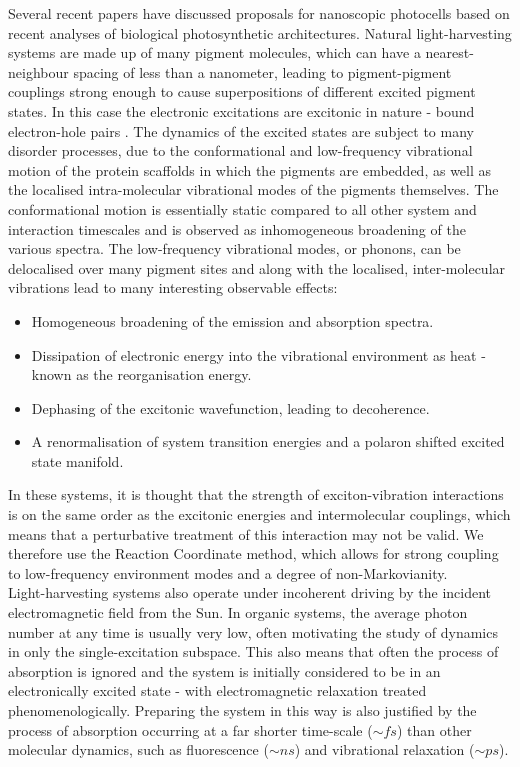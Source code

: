 \documentclass[]{article}
\begin{document}
Several recent papers have discussed proposals for nanoscopic photocells based on recent analyses of biological photosynthetic architectures\cite{Dorfman}\cite{Creatore2013}\cite{Killoran2015}\cite{Fruchtman2016}. Natural light-harvesting systems are made up of many pigment molecules, which can have a nearest-neighbour spacing of less than a nanometer\cite{Adolphs2006}, leading to pigment-pigment couplings strong enough to cause superpositions of different excited pigment states. In this case the electronic excitations are excitonic in nature - bound electron-hole pairs . The dynamics of the excited states are subject to many disorder processes, due to the conformational and low-frequency vibrational motion of the protein scaffolds in which the pigments are embedded, as well as the localised intra-molecular vibrational modes of the pigments themselves. The conformational motion is essentially static compared to all other system and interaction timescales and is observed as inhomogeneous broadening of the various spectra. The low-frequency vibrational modes, or phonons, can be delocalised over many pigment sites and along with the localised, inter-molecular vibrations lead to many interesting observable effects:

\begin{itemize}
	\item Homogeneous broadening of the emission and absorption spectra.
	\item Dissipation of electronic energy into the vibrational environment as heat - known as the reorganisation energy.
	\item Dephasing of the excitonic wavefunction, leading to decoherence.
	\item A renormalisation of system transition energies and a polaron shifted excited state manifold.
\end{itemize}
In these systems, it is thought that the strength of exciton-vibration interactions is on the same order as the excitonic energies and intermolecular couplings, which means that a perturbative treatment of this interaction may not be valid. We therefore use the Reaction Coordinate method, which allows for strong coupling to low-frequency environment modes and a degree of non-Markovianity. 
\\
Light-harvesting systems also operate under incoherent driving by the incident electromagnetic field from the Sun. In organic systems, the average photon number at any time is usually very low, often motivating the study of dynamics in only the single-excitation subspace. This also means that often the process of absorption is ignored and the system is initially considered to be in an electronically excited state - with electromagnetic relaxation treated phenomenologically. Preparing the system in this way is also justified by the process of absorption occurring at a far shorter time-scale ($\sim fs$) than other molecular dynamics, such as fluorescence ($\sim ns$) and vibrational relaxation ($\sim ps$). 
\end{document}
